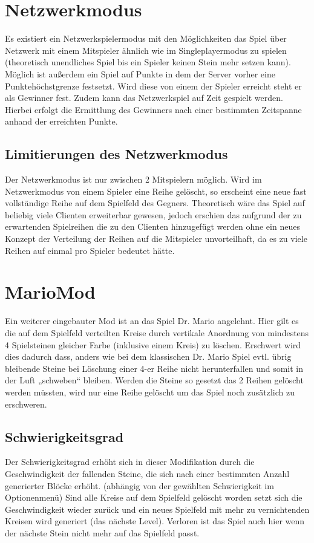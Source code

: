 \documentclass[10pt,a4paper,titlepage]{article}
\begin{document}
\section{Netzwerkmodus}
Es existiert ein Netzwerkspielermodus mit den Möglichkeiten das Spiel über Netzwerk mit
einem Mitspieler ähnlich wie im Singleplayermodus zu spielen (theoretisch unendliches
Spiel bis ein Spieler keinen Stein mehr setzen kann).
Möglich ist außerdem ein Spiel auf Punkte in dem der Server vorher eine
Punktehöchstgrenze festsetzt.
Wird diese von einem der Spieler erreicht steht er als Gewinner fest.
Zudem kann das Netzwerkspiel auf Zeit gespielt werden.
Hierbei erfolgt die Ermittlung des Gewinners nach einer bestimmten Zeitspanne anhand der
erreichten Punkte.
\subsection{Limitierungen des Netzwerkmodus}
Der Netzwerkmodus ist nur zwischen 2 Mitspielern möglich.
Wird im Netzwerkmodus von einem Spieler eine Reihe gelöscht, so erscheint eine neue fast
vollständige Reihe auf dem Spielfeld des Gegners.
Theoretisch wäre das Spiel auf beliebig viele Clienten erweiterbar gewesen, jedoch erschien
das aufgrund der zu erwartenden Spielreihen die zu den Clienten hinzugefügt werden ohne
ein neues Konzept der Verteilung der Reihen auf die Mitspieler unvorteilhaft, da es zu viele
Reihen auf einmal pro Spieler bedeutet hätte.
\section{MarioMod}
Ein weiterer eingebauter Mod ist an das Spiel Dr. Mario angelehnt.
Hier gilt es die auf dem Spielfeld verteilten Kreise durch vertikale Anordnung von
mindestens 4 Spielsteinen gleicher Farbe (inklusive einem Kreis) zu löschen.
Erschwert wird dies dadurch dass, anders wie bei dem klassischen Dr. Mario Spiel evtl.
übrig bleibende Steine bei Löschung einer 4-er Reihe nicht herunterfallen und somit in der
Luft „schweben“ bleiben.
Werden die Steine so gesetzt das 2 Reihen gelöscht werden müssten, wird nur eine Reihe
gelöscht um das Spiel noch zusätzlich zu erschweren.
\subsection{Schwierigkeitsgrad}
Der Schwierigkeitsgrad erhöht sich in dieser Modifikation durch die Geschwindigkeit der
fallenden Steine, die sich nach einer bestimmten Anzahl generierter Blöcke erhöht.
(abhängig von der gewählten Schwierigkeit im Optionenmenü)
Sind alle Kreise auf dem Spielfeld gelöscht worden setzt sich die Geschwindigkeit wieder
zurück und ein neues Spielfeld mit mehr zu vernichtenden Kreisen wird generiert (das
nächste Level).
Verloren ist das Spiel auch hier wenn der nächste Stein nicht mehr auf das Spielfeld passt.
\end{document}
